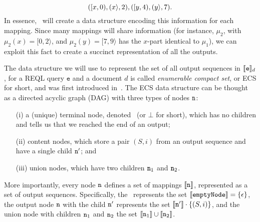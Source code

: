 $$
([ x,0),(x \rangle,2),([ y,4),(y \rangle,7).
$$
In essence, \rematch\ will create a data structure encoding this information for each mapping. Since many mappings will share information (for instance, $\mu_2$, with $\mu_2(x)=[0,2\rangle$, and $\mu_2(y)=[7,9\rangle$ has the $x$-part identical to $\mu_1$), we can exploit this fact to create a succinct representation of all the outputs.

The data structure we will use to represent the set of all output sequences in $\llbracket\texttt{e}\rrbracket_d$, for a REQL query $\texttt{e}$ and a document $d$ is called \emph{enumerable compact set}, or ECS for short, and was first introduced in~\cite{AmarilliJMR22,MunozR22}. The ECS data structure can be thought as a directed acyclic graph (DAG) with three types of nodes $\mathtt{n}$:
\begin{itemize}
	\item[(i)] a (unique) terminal node, denoted \cinit \ (or $\bot$ for short), which has no children and tells us that we reached the end of an output;
	\item[(ii)] content nodes, which store a pair $(S,i)$ from an output sequence and have a single child $\mathtt{n}'$; and
	\item[(iii)] union nodes, which have two children $\mathtt{n}_1$ and $\mathtt{n}_2$.
\end{itemize}
More importantly, every node $\mathtt{n}$ defines a set of mappings $\llbracket\mathtt{n}\rrbracket$, represented as a set of output sequences. Specifically, the \cinit \ represents the set $\llbracket\texttt{emptyNode}\rrbracket = \{\epsilon\}$, the output node $\mathtt{n}$ with the child $\mathtt{n}'$ represents the set $\llbracket\mathtt{n}'\rrbracket \cdot \{(S,i)\}$, and the union node with children $\mathtt{n}_1$ and $\mathtt{n}_2$ the set $\llbracket\mathtt{n}_1\rrbracket \cup \llbracket\mathtt{n}_2\rrbracket$.


